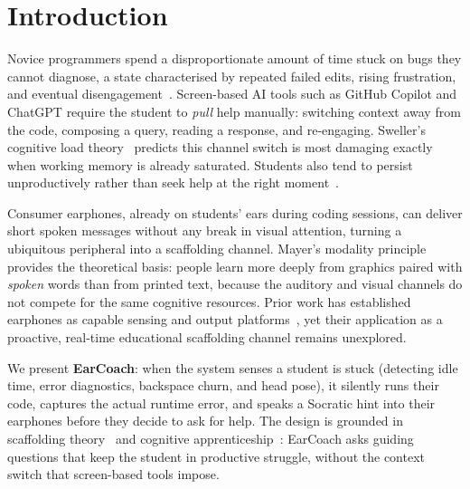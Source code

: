 \documentclass[sigconf,anonymous,review]{acmart}
\begin{document}

\maketitle

\section{Introduction}

Novice programmers spend a disproportionate amount of time stuck on bugs
they cannot diagnose, a state characterised by repeated failed edits,
rising frustration, and eventual disengagement~\cite{dmello2012}.
Screen-based AI tools such as GitHub Copilot and ChatGPT require the
student to \emph{pull} help manually: switching context away from the
code, composing a query, reading a response, and re-engaging. Sweller's
cognitive load theory~\cite{sweller1988} predicts this channel switch is
most damaging exactly when working memory is already saturated. Students
also tend to persist unproductively rather than seek help at the right
moment~\cite{roll2011}.

Consumer earphones, already on students' ears during coding sessions,
can deliver short spoken messages without any break in visual attention,
turning a ubiquitous peripheral into a scaffolding channel. Mayer's
modality principle~\cite{mayer2009} provides the theoretical basis:
people learn more deeply from graphics paired with \emph{spoken} words
than from printed text, because the auditory and visual channels do not
compete for the same cognitive resources. Prior work has established
earphones as capable sensing and output
platforms~\cite{roddiger2022,kawsar2018}, yet their application as a
proactive, real-time educational scaffolding channel remains unexplored.

We present \textbf{EarCoach}: when the system senses a student is stuck
(detecting idle time, error diagnostics, backspace churn, and head pose),
it silently runs their code, captures the actual runtime error, and
speaks a Socratic hint into their earphones before they decide to ask for
help. The design is grounded in scaffolding
theory~\cite{wood1976,vygotsky1978} and cognitive
apprenticeship~\cite{collins1989}: EarCoach asks guiding questions that
keep the student in productive struggle, without the context switch that
screen-based tools impose.
\end{document}

